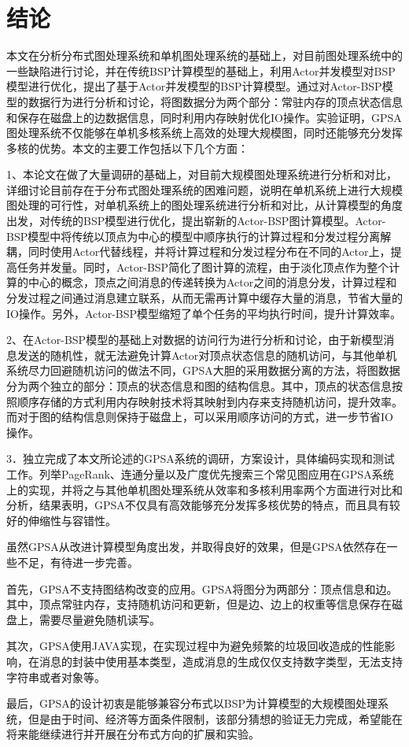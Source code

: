 
\chapter*{结\quad 论}

本文在分析分布式图处理系统和单机图处理系统的基础上，对目前图处理系统中的一些缺陷进行讨论，并在传统BSP计算模型的基础上，利用Actor并发模型对BSP模型进行优化，提出了基于Actor并发模型的BSP计算模型。通过对Actor-BSP模型的数据行为进行分析和讨论，将图数据分为两个部分：常驻内存的顶点状态信息和保存在磁盘上的边数据信息，同时利用内存映射优化IO操作。实验证明，GPSA图处理系统不仅能够在单机多核系统上高效的处理大规模图，同时还能够充分发挥多核的优势。本文的主要工作包括以下几个方面：

1、本论文在做了大量调研的基础上，对目前大规模图处理系统进行分析和对比，详细讨论目前存在于分布式图处理系统的困难问题，说明在单机系统上进行大规模图处理的可行性，对单机系统上的图处理系统进行分析和对比，从计算模型的角度出发，对传统的BSP模型进行优化，提出崭新的Actor-BSP图计算模型。Actor-BSP模型中将传统以顶点为中心的模型中顺序执行的计算过程和分发过程分离解耦，同时使用Actor代替线程，并将计算过程和分发过程分布在不同的Actor上，提高任务并发量。同时，Actor-BSP简化了图计算的流程，由于淡化顶点作为整个计算的中心的概念，顶点之间消息的传递转换为Actor之间的消息分发，计算过程和分发过程之间通过消息建立联系，从而无需再计算中缓存大量的消息，节省大量的IO操作。另外，Actor-BSP模型缩短了单个任务的平均执行时间，提升计算效率。

2、在Actor-BSP模型的基础上对数据的访问行为进行分析和讨论，由于新模型消息发送的随机性，就无法避免计算Actor对顶点状态信息的随机访问，与其他单机系统尽力回避随机访问的做法不同，GPSA大胆的采用数据分离的方法，将图数据分为两个独立的部分：顶点的状态信息和图的结构信息。其中，顶点的状态信息按照顺序存储的方式利用内存映射技术将其映射到内存来支持随机访问，提升效率。而对于图的结构信息则保持于磁盘上，可以采用顺序访问的方式，进一步节省IO操作。


3．独立完成了本文所论述的GPSA系统的调研，方案设计，具体编码实现和测试工作。列举PageRank、连通分量以及广度优先搜索三个常见图应用在GPSA系统上的实现，并将之与其他单机图处理系统从效率和多核利用率两个方面进行对比和分析，结果表明，GPSA不仅具有高效能够充分发挥多核优势的特点，而且具有较好的伸缩性与容错性。

虽然GPSA从改进计算模型角度出发，并取得良好的效果，但是GPSA依然存在一些不足，有待进一步完善。

首先，GPSA不支持图结构改变的应用。GPSA将图分为两部分：顶点信息和边。其中，顶点常驻内存，支持随机访问和更新，但是边、边上的权重等信息保存在磁盘上，需要尽量避免随机读写。

其次，GPSA使用JAVA实现，在实现过程中为避免频繁的垃圾回收造成的性能影响，在消息的封装中使用基本类型，造成消息的生成仅仅支持数字类型，无法支持字符串或者对象等。

最后，GPSA的设计初衷是能够兼容分布式以BSP为计算模型的大规模图处理系统，但是由于时间、经济等方面条件限制，该部分猜想的验证无力完成，希望能在将来能继续进行并开展在分布式方向的扩展和实验。

